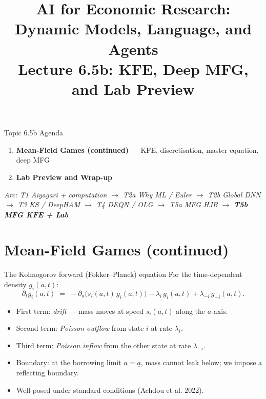 


\graphicspath{{./pic/}{../../MiniCourse_8hr/Slides/Module2_DL_RL_Macro/pic/}{../}}

\title[AI for Econ Research]{AI for Economic Research: Dynamic Models, Language, and Agents\\
Lecture 6.5b: KFE, Deep MFG, and Lab Preview}



\makebeamertitle

\begin{frame}{Topic 6.5b Agenda}
\begin{enumerate}
  \item \textbf{Mean-Field Games (continued)} --- KFE, discretisation, master equation, deep MFG
  \medskip
  \item \textbf{Lab Preview and Wrap-up}
\end{enumerate}
\medskip
\textit{Arc: T1 Aiyagari + computation $\to$ T2a Why ML / Euler $\to$ T2b Global DNN $\to$ T3 KS / DeepHAM $\to$ T4 DEQN / OLG $\to$ T5a MFG HJB $\to$ \textbf{T5b MFG KFE + Lab}}
\end{frame}

\section{Mean-Field Games (continued)}

\begin{frame}{The Kolmogorov forward (Fokker--Planck) equation}
For the time-dependent density $g_i(a,t)$:
\[
\partial_t g_i(a,t) \;=\; -\partial_a\!\big(s_i(a,t)\, g_i(a,t)\big)
- \lambda_i\, g_i(a,t) + \lambda_{-i}\, g_{-i}(a,t).
\]
\medskip

\begin{itemize}
\item First term: \emph{drift} --- mass moves at speed $s_i(a,t)$ along the $a$-axis.
\item Second term: \emph{Poisson outflow} from state $i$ at rate $\lambda_i$.
\item Third term: \emph{Poisson inflow} from the other state at rate $\lambda_{-i}$.
\medskip
\item Boundary: at the borrowing limit $a = \underline a$, mass cannot leak below; we impose a reflecting boundary.
\medskip
\item Well-posed under standard conditions (Achdou et al. 2022).
\end{itemize}
\end{frame}


